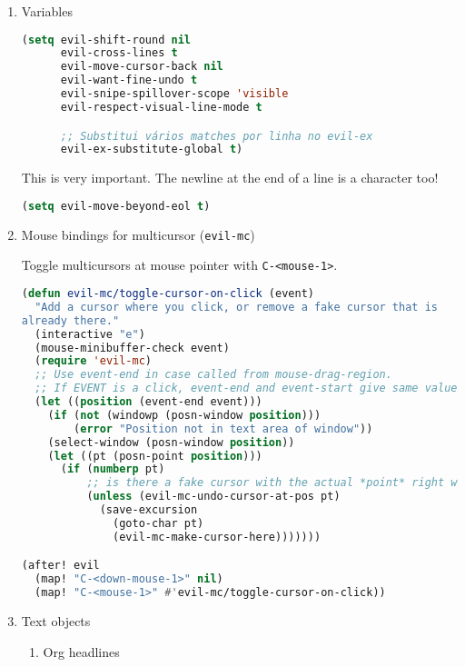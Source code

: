 \documentclass[11pt]{article}
\begin{document}
\begin{enumerate}
  \item Variables
  \label{sec:variables}

  \begin{lstlisting}[language=Lisp]
(setq evil-shift-round nil
      evil-cross-lines t
      evil-move-cursor-back nil
      evil-want-fine-undo t
      evil-snipe-spillover-scope 'visible
      evil-respect-visual-line-mode t

      ;; Substitui vários matches por linha no evil-ex
      evil-ex-substitute-global t)
\end{lstlisting}

This is very important. The newline at the end of a line is a character too!

\begin{lstlisting}[language=Lisp]
(setq evil-move-beyond-eol t)
\end{lstlisting}
  \item Mouse bindings for multicursor (\texttt{evil-mc})
  \label{sec:mouse-bindings-for-multicursor-evil-mc}

  Toggle multicursors at mouse pointer with \texttt{C-<mouse-1>}.

\begin{lstlisting}[language=Lisp]
(defun evil-mc/toggle-cursor-on-click (event)
  "Add a cursor where you click, or remove a fake cursor that is
already there."
  (interactive "e")
  (mouse-minibuffer-check event)
  (require 'evil-mc)
  ;; Use event-end in case called from mouse-drag-region.
  ;; If EVENT is a click, event-end and event-start give same value.
  (let ((position (event-end event)))
    (if (not (windowp (posn-window position)))
        (error "Position not in text area of window"))
    (select-window (posn-window position))
    (let ((pt (posn-point position)))
      (if (numberp pt)
          ;; is there a fake cursor with the actual *point* right where we are?
          (unless (evil-mc-undo-cursor-at-pos pt)
            (save-excursion
              (goto-char pt)
              (evil-mc-make-cursor-here)))))))

(after! evil
  (map! "C-<down-mouse-1>" nil)
  (map! "C-<mouse-1>" #'evil-mc/toggle-cursor-on-click))
\end{lstlisting}
  \item Text objects
  \label{sec:text-objects}

  
\begin{enumerate}
  \item Org headlines
  \label{sec:org-headlines}


\end{enumerate}
\end{enumerate}
\end{document}

